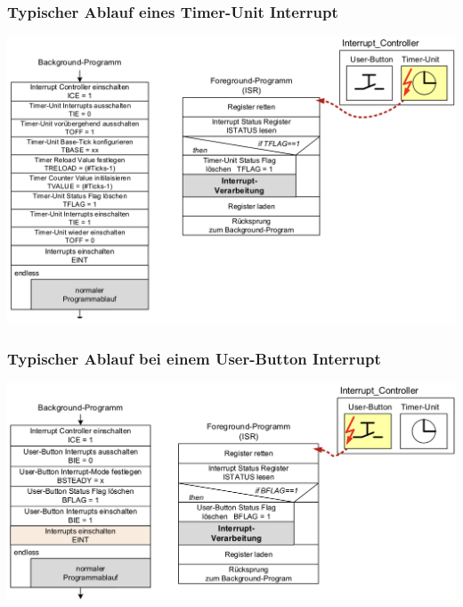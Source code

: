 \subsubsection{Typischer Ablauf eines Timer-Unit Interrupt}
\includegraphics[width=18cm]{pics/8-Interruptablauf}

\subsubsection{Typischer Ablauf bei einem User-Button Interrupt}
\includegraphics[width=18cm]{pics/8-User_Button_Interrupt}